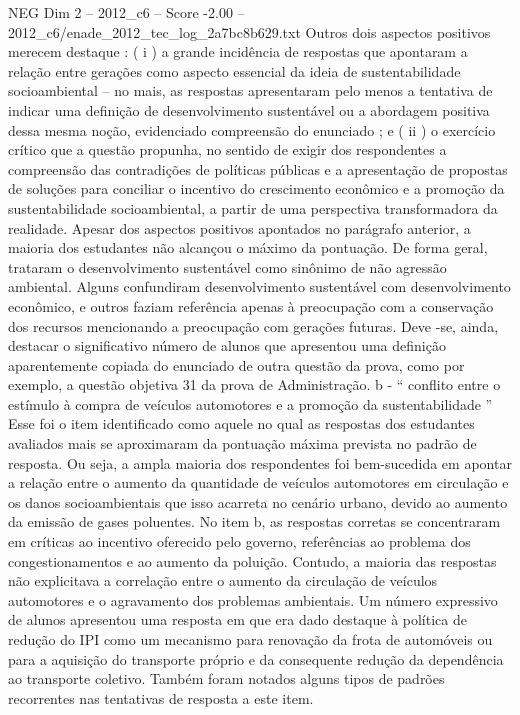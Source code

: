 \begin{textsample}{NEG Dim 2 – 2012\_c6 – Score -2.00 – 2012\_c6/enade\_2012\_tec\_log\_2a7bc8b629.txt}
Outros dois aspectos positivos merecem destaque : ( i ) a grande incidência de respostas que apontaram a relação entre gerações como aspecto essencial da ideia de sustentabilidade socioambiental – no mais, as respostas apresentaram pelo menos a tentativa de indicar uma definição de desenvolvimento sustentável ou a abordagem positiva dessa mesma noção, evidenciado compreensão do enunciado ; e ( ii ) o exercício crítico que a questão propunha, no sentido de exigir dos respondentes a compreensão das contradições de políticas públicas e a apresentação de propostas de soluções para conciliar o incentivo do crescimento econômico e a promoção da sustentabilidade socioambiental, a partir de uma perspectiva transformadora da realidade.
Apesar dos aspectos positivos apontados no parágrafo anterior, a maioria dos estudantes não alcançou o máximo da pontuação.
De forma geral, trataram o desenvolvimento sustentável como sinônimo de não agressão ambiental.
Alguns confundiram desenvolvimento sustentável com desenvolvimento econômico, e outros faziam referência apenas à preocupação com a conservação dos recursos mencionando a preocupação com gerações futuras.
Deve -se, ainda, destacar o significativo número de alunos que apresentou uma definição aparentemente copiada do enunciado de outra questão da prova, como por exemplo, a questão objetiva 31 da prova de Administração. b - “ conflito entre o estímulo à compra de veículos automotores e a promoção da sustentabilidade ” Esse foi o item identificado como aquele no qual as respostas dos estudantes avaliados mais se aproximaram da pontuação máxima prevista no padrão de resposta.
Ou seja, a ampla maioria dos respondentes foi bem-sucedida em apontar a relação entre o aumento da quantidade de veículos automotores em circulação e os danos socioambientais que isso acarreta no cenário urbano, devido ao aumento da emissão de gases poluentes.
No item b, as respostas corretas se concentraram em críticas ao incentivo oferecido pelo governo, referências ao problema dos congestionamentos e ao aumento da poluição.
Contudo, a maioria das respostas não explicitava a correlação entre o aumento da circulação de veículos automotores e o agravamento dos problemas ambientais.
Um número expressivo de alunos apresentou uma resposta em que era dado destaque à política de redução do IPI como um mecanismo para renovação da frota de automóveis ou para a aquisição do transporte próprio e da consequente redução da dependência ao transporte coletivo.
Também foram notados alguns tipos de padrões recorrentes nas tentativas de resposta a este item.

\end{textsample}
